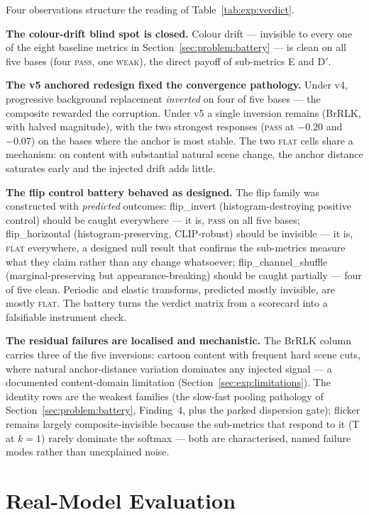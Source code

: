 Four observations structure the reading of Table~\ref{tab:exp:verdict}.

\textbf{The colour-drift blind spot is closed.} Colour drift --- invisible to
every one of the eight baseline metrics in
Section~\ref{sec:problem:battery} --- is clean on all five bases (four
\textsc{pass}, one \textsc{weak}), the direct payoff of sub-metrics E and
D$'$.

\textbf{The v5 anchored redesign fixed the convergence pathology.} Under v4,
progressive background replacement \emph{inverted} on four of five bases ---
the composite rewarded the corruption. Under v5 a single inversion remains
(BrRLK, with halved magnitude), with the two strongest responses
(\textsc{pass} at $-0.20$ and $-0.07$) on the bases where the anchor is most
stable. The two \textsc{flat} cells share a mechanism: on content with
substantial natural scene change, the anchor distance saturates early and the
injected drift adds little.

\textbf{The flip control battery behaved as designed.} The flip family was
constructed with \emph{predicted} outcomes: flip\_invert (histogram-destroying
positive control) should be caught everywhere --- it is, \textsc{pass} on all
five bases; flip\_horizontal (histogram-preserving, CLIP-robust) should be
invisible --- it is, \textsc{flat} everywhere, a designed null result that
confirms the sub-metrics measure what they claim rather than any change
whatsoever; flip\_channel\_shuffle (marginal-preserving but
appearance-breaking) should be caught partially --- four of five clean.
Periodic and elastic transforms, predicted mostly invisible, are mostly
\textsc{flat}. The battery turns the verdict matrix from a scorecard into a
falsifiable instrument check.

\textbf{The residual failures are localised and mechanistic.} The BrRLK column
carries three of the five inversions: cartoon content with frequent hard scene
cuts, where natural anchor-distance variation dominates any injected signal
--- a documented content-domain limitation
(Section~\ref{sec:exp:limitations}). The identity rows are the weakest
families (the slow-fast pooling pathology of
Section~\ref{sec:problem:battery}, Finding~4, plus the parked dispersion
gate); flicker remains largely composite-invisible because the sub-metrics
that respond to it (T at $k{=}1$) rarely dominate the softmax --- both are
characterised, named failure modes rather than unexplained noise.

\section{Real-Model Evaluation}
\label{sec:exp:real}

